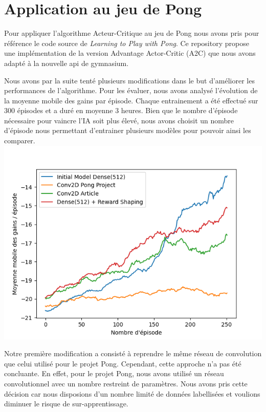 \section{Application au jeu de Pong}

Pour appliquer l'algorithme Acteur-Critique au jeu de Pong nous avons pris pour référence le code source
de \emph{Learning to Play with Pong}\cite{PongGithub}. Ce repository propose une implémentation de la version Advantage Actor-Critic (A2C)
que nous avons adapté à la nouvelle api de gymnasium.

Nous avons par la suite tenté plusieurs modifications dans le but d'améliorer les performances de l'algorithme.
Pour les évaluer, nous avons analysé l'évolution de la moyenne mobile des gains par épisode.
Chaque entrainement a été effectué sur 300 épisodes et a duré en moyenne 3 heures. Bien que le nombre d'épisode nécessaire
pour vaincre l'IA soit plus élevé, nous avons choisit un nombre d'épisode nous permettant d'entrainer plusieurs modèles pour pouvoir ainsi les comparer.
\includegraphics[width=\linewidth]{rolling_average_graph.png}

\par Notre première modification a consisté à reprendre le même réseau de convolution que celui utilisé pour le projet Pong. 
Cependant, cette approche n'a pas été concluante. 
En effet, pour le projet Pong, nous avons utilisé un réseau convolutionnel avec un nombre restreint de 
paramètres. Nous avons pris cette décision car nous disposions d'un nombre limité de données labellisées 
et voulions diminuer le risque de sur-apprentissage. 

